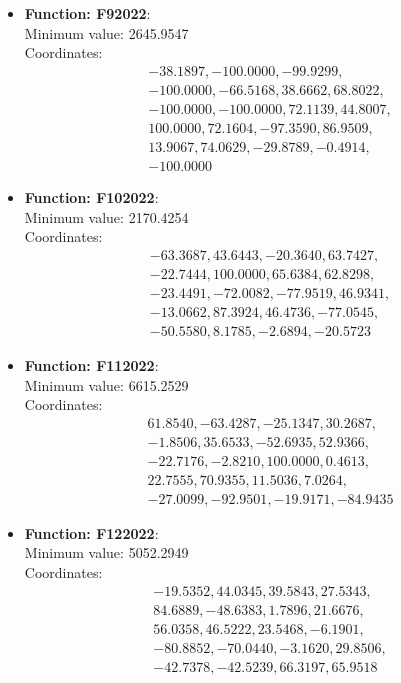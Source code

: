 \documentclass{article}
\begin{document}
\begin{itemize}
  \item \textbf{Function: F92022}: \\
    Minimum value: 2645.9547 \\
    Coordinates:
    \[
      \begin{aligned}
        & -38.1897, -100.0000, -99.9299, \\
        & -100.0000, -66.5168, 38.6662, 68.8022, \\
        & -100.0000, -100.0000, 72.1139, 44.8007, \\
        & 100.0000, 72.1604, -97.3590, 86.9509, \\
        & 13.9067, 74.0629, -29.8789, -0.4914, \\
        & -100.0000
      \end{aligned}
    \]

  \item \textbf{Function: F102022}: \\
    Minimum value: 2170.4254 \\
    Coordinates:
    \[
      \begin{aligned}
        & -63.3687, 43.6443, -20.3640, 63.7427, \\
        & -22.7444, 100.0000, 65.6384, 62.8298, \\
        & -23.4491, -72.0082, -77.9519, 46.9341, \\
        & -13.0662, 87.3924, 46.4736, -77.0545, \\
        & -50.5580, 8.1785, -2.6894, -20.5723
      \end{aligned}
    \]

  \item \textbf{Function: F112022}: \\
    Minimum value: 6615.2529 \\
    Coordinates:
    \[
      \begin{aligned}
        & 61.8540, -63.4287, -25.1347, 30.2687, \\
        & -1.8506, 35.6533, -52.6935, 52.9366, \\
        & -22.7176, -2.8210, 100.0000, 0.4613, \\
        & 22.7555, 70.9355, 11.5036, 7.0264, \\
        & -27.0099, -92.9501, -19.9171, -84.9435
      \end{aligned}
    \]

  \item \textbf{Function: F122022}: \\
    Minimum value: 5052.2949 \\
    Coordinates:
    \[
      \begin{aligned}
        & -19.5352, 44.0345, 39.5843, 27.5343, \\
        & 84.6889, -48.6383, 1.7896, 21.6676, \\
        & 56.0358, 46.5222, 23.5468, -6.1901, \\
        & -80.8852, -70.0440, -3.1620, 29.8506, \\
        & -42.7378, -42.5239, 66.3197, 65.9518
      \end{aligned}
    \]

\end{itemize}
\end{document}
